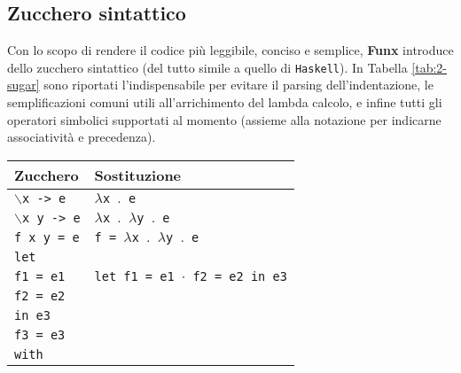 \subsection{Zucchero sintattico}
\label{sec:2-4-syntactic-sugar}

Con lo scopo di rendere il codice più leggibile, conciso e semplice, \textbf{Funx} introduce
dello zucchero sintattico (del tutto simile a quello di \texttt{Haskell}).
In Tabella \ref{tab:2-sugar} sono riportati l'indispensabile per evitare il parsing dell'indentazione,
le semplificazioni comuni utili all'arrichimento del lambda calcolo, e infine tutti gli operatori simbolici
supportati al momento (assieme alla notazione per indicarne associatività e precedenza).

\newpage

\begin{table}[H]
    \begin{center}
        \begin{tabularx}{\textwidth}{|P{15em}|X|}
            \hline
            \textbf{Zucchero}                & \textbf{Sostituzione}                                            \\
            \hline
            \texttt{$\backslash$x -> e}      & \texttt{$\lambda$x $\mathord{.}$ e}                              \\
            \hline
            \texttt{$\backslash$x y -> e}    & \texttt{$\lambda$x $\mathord{.}$ $\lambda$y $\mathord{.}$ e}     \\
            \hline
            \texttt{f x y = e}               & \texttt{f = $\lambda$x $\mathord{.}$ $\lambda$y $\mathord{.}$ e} \\
            \hline
            \texttt{let}                     &                                                                  \\
            \texttt{f1 = e1}                 & \texttt{let f1 = e1 $\cdot$ f2 = e2 in e3}                       \\
            \texttt{f2 = e2}                 &                                                                  \\
            \texttt{in e3}                   &                                                                  \\
            \hline
            \texttt{f3 = e3}                 &                                                                  \\
            \texttt{with}                    &                                                                  \\

\end{tabularx}
\end{center}
\end{table}
